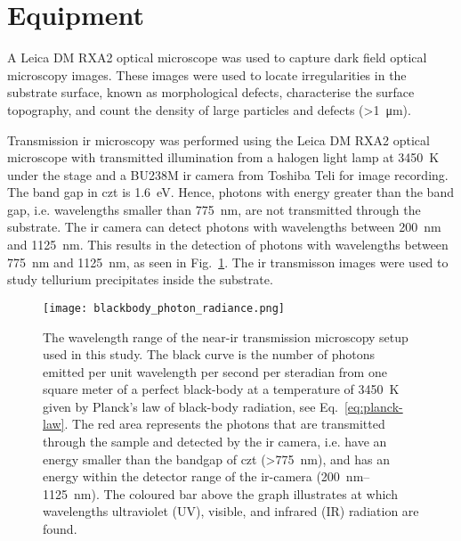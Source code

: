 \section{Equipment}


A Leica DM RXA2 optical microscope was used to capture dark field optical microscopy images. These images were used to locate irregularities in the substrate surface, known as morphological defects, characterise the surface topography, and count the density of large particles and defects (\SI{>1}{\micro\metre}).

Transmission \ac{ir} microscopy was performed using the Leica DM RXA2 optical microscope with transmitted illumination from a halogen light lamp at \SI{3450}{\kelvin} under the stage and a BU238M \ac{ir} camera from Toshiba Teli for image recording. The band gap in \ac{czt} is \SI{1.6}{\electronvolt}. Hence, photons with energy greater than the band gap, i.e. wavelengths smaller than \SI{775}{\nano\metre}, are not transmitted through the substrate. The \ac{ir} camera can detect photons with wavelengths between \SI{200}{\nano\metre} and \SI{1125}{\nano\metre}. This results in the detection of photons with wavelengths between \SI{775}{\nano\metre} and \SI{1125}{\nano\metre}, as seen in Fig.~\ref{fig:ir-range}. The \ac{ir} transmisson images were used to study tellurium precipitates inside the substrate. %

\begin{figure}[htbp]
    \centering
    \texttt{[image: blackbody\_photon\_radiance.png]}
    \caption[Graph showing the wavelength range of the near-\ac{ir} transmission microscopy setup.]{The wavelength range of the near-\ac{ir} transmission microscopy setup used in this study. The black curve is the number of photons emitted per unit wavelength per second per steradian from one square meter of a perfect black-body at a temperature of \SI{3450}{\kelvin} given by Planck's law of black-body radiation, see Eq.~\eqref{eq:planck-law}. The red area represents the photons that are transmitted through the sample and detected by the \ac{ir} camera, i.e. have an energy smaller than the bandgap of \ac{czt} (\SI{>775}{\nano\metre}),  and has an energy within the detector range of the \ac{ir}-camera (\SIrange{200}{1125}{\nano\metre}). The coloured bar above the graph illustrates at which wavelengths ultraviolet (UV), visible, and infrared (IR) radiation are found.}
    \label{fig:ir-range}
\end{figure}

